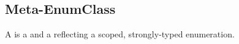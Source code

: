 \subsection{Meta-EnumClass}
\label{concept-Meta-EnumClass}

A  is a  and a 
reflecting a scoped, strongly-typed enumeration.



